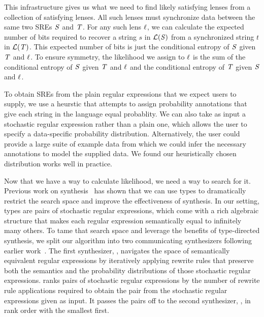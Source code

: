 \documentclass[acmsmall,screen,anonymous]{acmart}
\begin{document}
This infrastructure gives us what we need to find likely satisfying lenses from
a collection of satisfying lenses. All such lenses must synchronize data between
the same two SREs $\mathit{S}$ and $\mathit{T}$. For any such lens $\mathit{\ell}$, we can
calculate the expected number of bits required to recover a string $s$ in
$\mathcal{L}(\mathit{S})$ from a synchronized string $t$ in
$\mathcal{L}(\mathit{T})$. This expected number of bits is just the conditional
entropy of $\mathit{S}$ given $\mathit{T}$ and $\mathit{\ell}$. To ensure symmetry, the
likelihood we assign to $\mathit{\ell}$ is the sum of the conditional entropy of
$\mathit{S}$ given $\mathit{T}$ and $\mathit{\ell}$ and the conditional entropy of
$\mathit{T}$ given $\mathit{S}$ and $\mathit{\ell}$.

To obtain SREs from the plain regular expressions that
we expect users to supply, we use a heurstic that attempts to assign probability
annotations that give each string in the language equal probablity. We can also
take as input a stochastic regular expression rather than a plain one, which
allows the user to specify a data-specific probability distribution.
Alternatively, the user could provide a large suite of example data from which
we could infer the necessary annotations to model the supplied data. We found
our heuristically chosen distribution works well in practice.

Now that we have a way to calculate likelihood, we need a way to search for
it.
Previous work on synthesis~\cite{?,?,?} has shown
that we can use types to dramatically restrict the search space and
improve the effectiveness of synthesis.  In our setting, types are
pairs of stochastic regular expressions, which come with a rich
algebraic structure that makes each regular expression semantically
equal to infinitely many others.  To tame that search space and
leverage the benefits of type-directed synthesis, we split our
algorithm into two communicating synthesizers following earlier
work~\cite{quotient-lens-synthesis}.  The first
synthesizer, \RXSearch, navigates the space of semantically equivalent
regular expressions by iteratively applying rewrite rules that
preserve both the semantics and the probability
distributions of those stochastic regular expressions. \RXSearch
ranks pairs of stochastic regular expressions 
by the number of rewrite rule applications required to obtain the pair
from the stochastic regular expressions given as input. It passes the
pairs off to the second synthesizer, \GreedySynth, in rank order with
the smallest first.
\end{document}
